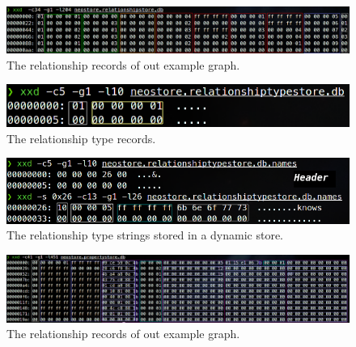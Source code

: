 \documentclass[a4paper,10pt]{article}
\begin{document}
    \begin{figure}[htp]\label{relationships}
        \begin{center}
            \includegraphics[keepaspectratio,height=1.2\textheight,width=1.2\textwidth]{img/04_example/relationships.png}
        \end{center}
        \caption{The relationship records of out example graph.}
    \end{figure}
    \begin{figure}[htp]\label{relation_type_token}
        \begin{center}
            \includegraphics[keepaspectratio,height=1.2\textheight,width=1.2\textwidth]{img/04_example/relationshiptype_token.png}
        \end{center}
        \caption{The relationship type records.} 
    \end{figure}
    \begin{figure}[htp]\label{relationship_type_string}
        \begin{center}
            \includegraphics[keepaspectratio,height=1.2\textheight,width=1.2\textwidth]{img/04_example/relationshiptype_string_dynamic.png}
        \end{center}
        \caption{The relationship type strings stored in a dynamic store.} 
    \end{figure}
    \begin{figure}[htp]\label{properties}
        \begin{center}
            \includegraphics[keepaspectratio,height=1.2\textheight,width=1.2\textwidth]{img/04_example/properties.png}
        \end{center}
        \caption{The relationship records of out example graph.}
    \end{figure}
\end{document}
